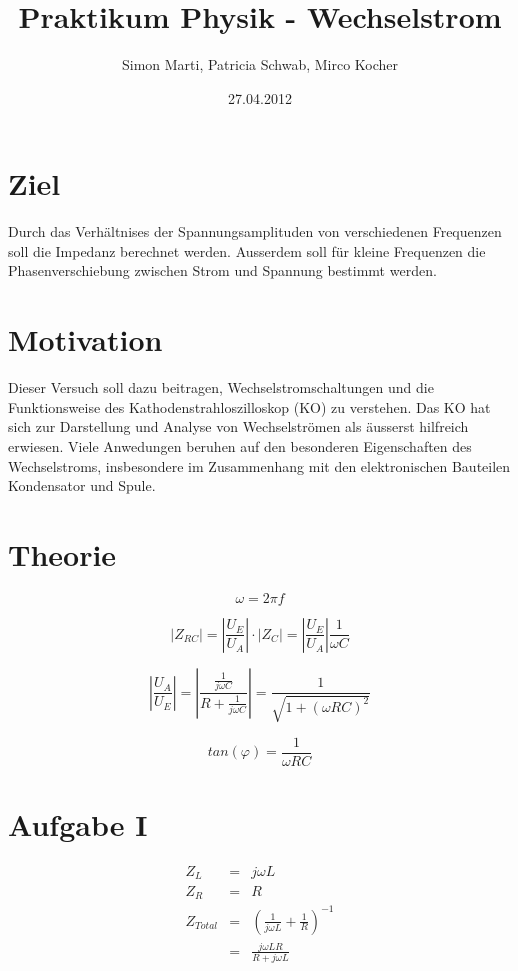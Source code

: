 \documentclass[12pt,a4paper]{article}
\title{Praktikum Physik - Wechselstrom}
\author{Simon Marti, Patricia Schwab, Mirco Kocher}
\date{27.04.2012}
\begin{document}
\maketitle

\section*{Ziel}
Durch das Verh\"altnises der Spannungsamplituden von verschiedenen Frequenzen soll die Impedanz berechnet werden.
Ausserdem soll f\"ur kleine Frequenzen die Phasenverschiebung zwischen Strom und Spannung bestimmt werden.


\section*{Motivation}
Dieser Versuch soll dazu beitragen, Wechselstromschaltungen und die Funktionsweise des Kathodenstrahloszilloskop (KO) zu verstehen.
Das KO hat sich zur Darstellung und Analyse von Wechselstr\"omen als \"ausserst hilfreich erwiesen.
Viele Anwedungen beruhen auf den besonderen Eigenschaften des Wechselstroms, insbesondere im Zusammenhang mit den elektronischen Bauteilen Kondensator und Spule.


\section*{Theorie}
\begin{equation}
\omega = 2\pi f
\end{equation}

\begin{equation}
|Z_{RC}| = \left| \frac{U_E}{U_A} \right| \cdot |Z_C| = \left| \frac{U_E}{U_A} \right| \frac{1}{\omega C}
\end{equation}

\begin{equation}
\left| \frac{U_A}{U_E} \right|= \left| \frac{\frac{1}{j\omega C}}{R + \frac{1}{j\omega C}}\right| = \frac{1}{\sqrt{1+(\omega RC)^2}}
\end{equation}

\begin{equation}
tan(\varphi) = \frac{1}{\omega R C}
\end{equation}

\section*{Aufgabe I}
\begin{eqnarray*}
Z_L & = & j \omega L \\
Z_R & = & R \\
Z_{Total} & = & \left( \frac{1}{j \omega L} + \frac{1}{R} \right) ^{-1} \\
& = & \frac{j \omega L R}{R + j \omega L}
\end{eqnarray*}
\end{document}
